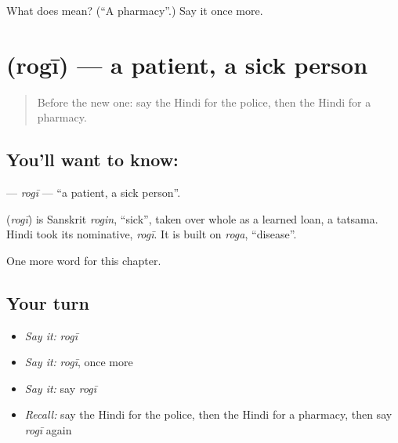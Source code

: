 \begin{tcolorbox}[breakable,colback=teal!4,colframe=teal!35!black,title={Before you move on}]
What does  mean? (\textquotedblleft{}A pharmacy\textquotedblright{}.) Say it once more.
\end{tcolorbox}
\section[\texorpdfstring{\hi{रोगी} (rogī)}{रोगी (rogī)}]{ (rogī) — a patient, a sick person}

\label{lesson:HI-C273-rogi}



\begin{quote}
Before the new one: say the Hindi for the police, then the Hindi for a pharmacy.
\end{quote}

\subsection*{You'll want to know: }
\textbf{} — \emph{rogī} — \textquotedblleft{}a patient, a sick person\textquotedblright{}.

\begin{cousinweb}
\textbf{} (\emph{rogī}) is Sanskrit \emph{rogin}, \textquotedblleft{}sick\textquotedblright{}, taken over whole as a learned loan, a tatsama. Hindi took its nominative, \emph{rogī}. It is built on \emph{roga}, \textquotedblleft{}disease\textquotedblright{}.
\end{cousinweb}

\begin{grammarlens}[title={What you've built}]
One more word for this chapter.
\end{grammarlens}

\subsection*{Your turn}
\begin{itemize}
\raggedright
  \item \emph{Say it:} \emph{rogī}
  \item \emph{Say it:} \emph{rogī}, once more
  \item \emph{Say it:} say \emph{rogī}
  \item \emph{Recall:} say the Hindi for the police, then the Hindi for a pharmacy, then say \emph{rogī} again
\end{itemize}

